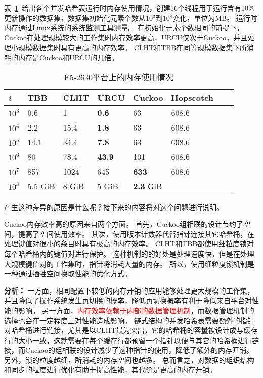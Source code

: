 表~\ref{tab:memusage}~给出各个并发哈希表运行时内存使用情况，创建16个线程用于运行含有10\%更新操作的数据集，数据集初始化元素个数从10$^3$到10$^8$变化，单位为MB。
运行时内存通过Linux系统的系统监测工具测量。
在初始化元素个数相同的前提下，Cuckoo在处理规模较大的工作集时内存效率更高，URCU仅次于Cuckoo，并且处理小规模数据集时具有更高的内存效率。
CLHT和TBB在同等规模数据集下所消耗的内存是Cuckoo和URCU的几倍。


\begin{table}[htbp]
  \centering
  \caption{E5-2630平台上的内存使用情况}
  \label{tab:memusage}
  \begin{tabular}{llllllll}
    \toprule
       \textit{i}   &   TBB   &    CLHT    &  URCU     &  Cuckoo &     Hopscotch \\
    \midrule
$10^3$     & 0.6  &   1   &  \textbf{0.6}   & 63 &   608.6    \\

$10^4$     & 2.2   &  15.4   &   \textbf{1.8}    & 63  &   608.6    \\

$10^5$     & 14.1 &    34.4   &   \textbf{7.8}   & 63  &  608.6     \\

$10^6$     & 80   &  78.4    &   \textbf{43.9}   & 101 &  608.6       \\

 $10^7$    &  857  &   1024   &   645    & \textbf{633} &  608.6     \\

 $10^8$    &  5.5 GiB  &   8 GiB   &   5 GiB    & \textbf{2.3} GiB &       \\
    \bottomrule
  \end{tabular}
\end{table}

产生这种差异的原因是什么呢？接下来的内容将对这个问题进行说明。

Cuckoo内存效率高的原因来自两个方面。
首先，Cuckoo组相联的设计节约了空间，提高了空间使用效率。
其次，使用版本计数器代替指针连接其它哈希桶，在处理键值对很小的条目时具有极高的内存效率。
CLHT和TBB都使用细粒度锁对每个哈希桶内的键值对进行保护。
这种机制的的好处是处理速度快，但是在处理大规模键值对的工作集时，指针将消耗大量的内存。
所以，使用细粒度锁机制是一种通过牺牲空间换取性能的优化方式。

\textbf{分析：} 一方面，相同配置下较低的内存开销的应用能够处理更大规模的工作集，并且降低了操作系统发生页切换的概率，降低页切换概率有利于降低来自平台对性能的影响。
另一方面，\textcolor{red}{内存效率依赖于内部的数据管理机制}，而数据管理机制的选择也会在一定程度上对性能造成影响。
链式结构的并发哈希表需要额外的指针对哈希桶进行链接，尤其是以CLHT最为突出，它的哈希桶的容量被设计成与缓存行的大小一致，这就需要在每个缓存行都预留一个指针以便与其它的哈希桶进行链接，而Cuckoo的组相联的设计减少了这种指针的使用，降低了额外的内存开销。
另外，锁的粒度越细，所消耗的内存空间也越多。
总而言之，对数据的组织结构和同步的粒度进行优化有助于提高性能，其代价是更高的内存开销。

